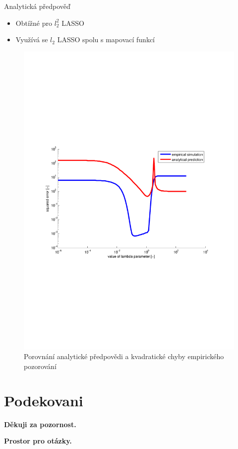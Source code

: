 \begin{frame}
	\vfill
	\begin{block}{Analytická předpověď}
		\begin{itemize}
			\item Obtížné pro $l_{2}^{2}$ LASSO
			\item Využívá se $l_{2}$ LASSO spolu s mapovací funkcí
		\end{itemize}
	\end{block}
\end{frame}
\begin{frame}
	\vfill
		\begin{figure}[!ht]
			\begin{center}
				\includegraphics[scale=0.55]{obr/nsel2.pdf}
			\end{center}
			\caption{Porovnání analytické předpovědi a kvadratické chyby empirického pozorování}
			\label{fig:nsel2}
		\end{figure}
\end{frame}
\section{Podekovani}
\begin{frame}
	\vfill
  \begin{center}
  {\Large \bfseries
    Děkuji za pozornost.
    } 
  \end{center}
  
  \begin{center}
  	{\Large \bfseries
  		Prostor pro otázky.
  	} 
  \end{center}
\end{frame}

